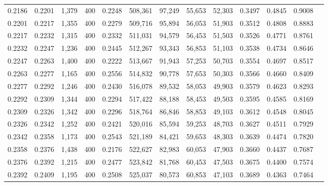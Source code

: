 \begin{tabular}{rrrrrrrrrrrrr}
0.2186 & 0.2201 &  1,379 & 400 &                                     0.2248 & 508,361 &  97,249 &  55,653 &  52,303 & 0.3497 & 0.4845 & 0.9008 \\
0.2201 & 0.2217 &  1,355 & 400 &                                     0.2279 & 509,716 &  95,894 &  56,053 &  51,903 & 0.3512 & 0.4808 & 0.8883 \\
0.2217 & 0.2232 &  1,315 & 400 &                                     0.2332 & 511,031 &  94,579 &  56,453 &  51,503 & 0.3526 & 0.4771 & 0.8761 \\
0.2232 & 0.2247 &  1,236 & 400 &                                     0.2445 & 512,267 &  93,343 &  56,853 &  51,103 & 0.3538 & 0.4734 & 0.8646 \\
0.2247 & 0.2263 &  1,400 & 400 &                                     0.2222 & 513,667 &  91,943 &  57,253 &  50,703 & 0.3554 & 0.4697 & 0.8517 \\
0.2263 & 0.2277 &  1,165 & 400 &                                     0.2556 & 514,832 &  90,778 &  57,653 &  50,303 & 0.3566 & 0.4660 & 0.8409 \\
0.2277 & 0.2292 &  1,246 & 400 &                                     0.2430 & 516,078 &  89,532 &  58,053 &  49,903 & 0.3579 & 0.4623 & 0.8293 \\
0.2292 & 0.2309 &  1,344 & 400 &                                     0.2294 & 517,422 &  88,188 &  58,453 &  49,503 & 0.3595 & 0.4585 & 0.8169 \\
0.2309 & 0.2326 &  1,342 & 400 &                                     0.2296 & 518,764 &  86,846 &  58,853 &  49,103 & 0.3612 & 0.4548 & 0.8045 \\
0.2326 & 0.2342 &  1,252 & 400 &                                     0.2421 & 520,016 &  85,594 &  59,253 &  48,703 & 0.3627 & 0.4511 & 0.7929 \\
0.2342 & 0.2358 &  1,173 & 400 &                                     0.2543 & 521,189 &  84,421 &  59,653 &  48,303 & 0.3639 & 0.4474 & 0.7820 \\
0.2358 & 0.2376 &  1,438 & 400 &                                     0.2176 & 522,627 &  82,983 &  60,053 &  47,903 & 0.3660 & 0.4437 & 0.7687 \\
0.2376 & 0.2392 &  1,215 & 400 &                                     0.2477 & 523,842 &  81,768 &  60,453 &  47,503 & 0.3675 & 0.4400 & 0.7574 \\
0.2392 & 0.2409 &  1,195 & 400 &                                     0.2508 & 525,037 &  80,573 &  60,853 &  47,103 & 0.3689 & 0.4363 & 0.7464 \\

\end{tabular}
